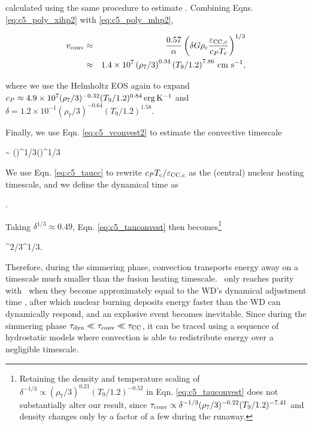 \noindent calculated using the same procedure to estimate \Lconv.  Combining Eqns. \ref{eq:c5_poly_xihp2} with \ref{eq:c5_poly_mhp2},

\begin{eqnarray}
\vconv &\approx& \frac{0.57}{\alpha}\left(\delta G\rhoc\frac{\epscentral}{c_P \Tc}\right)^{1/3} \nonumber \\
&\approx& 1.4\times10^{7}\left(\rho_7/3\right)^{0.34}\left(T_9/1.2\right)^{7.86}\,\cmpsec,
\label{eq:c5_vconvest2}
\end{eqnarray}

\noindent where we use the Helmholtz EOS again to expand $c_P \approx 4.9\times10^7(\rho_7/3)^{-0.32}(T_9/1.2)^{0.84}\,\mathrm{erg}\,\mathrm{K}^{-1}$ and $\delta = 1.2\times10^{-1}(\rho_7/3)^{-0.64}(T_9/1.2)^{1.58}$.

Finally, we use Eqn. \ref{eq:c5_vconvest2} to estimate the convective timescale

\eqbegin
\tauconv \sim {} \approx {}\left(\right)^{1/3}\left(\right)^{1/3}
\label{eq:c5_tauconvest}
\eqend

\noindent We use Eqn. \ref{eq:c5_taucc} to rewrite $c_P\Tc/\epscentral$ as the (central) nuclear heating timescale, and we define the dynamical time as

\eqbegin
\taudyn \equiv {}.
\label{eq:c5_taudyn}
\eqend


\noindent Taking $\delta^{1/3} \approx 0.49$, Eqn. \ref{eq:c5_tauconvest} then becomes\footnote{Retaining the density and temperature scaling of $\delta^{-1/3} \propto (\rho_7/3)^{0.21}(T_9/1.2)^{-0.52}$ in Eqn. \ref{eq:c5_tauconvest} does not substantially alter our result, since $\tauconv \propto \delta^{-1/3}(\rho_7/3)^{-0.22}(T_9/1.2)^{-7.41}$ and density changes only by a factor of a few during the runaway.}

\eqbegin
\tauconv {}\taudyn^{2/3}\taucc^{1/3}.
\label{eq:c5_tauconvest2}
\eqend

Therefore, during the simmering phase, convection transports energy away on a timescale much smaller than the fusion heating timescale.  \taucc\ only reaches parity with \tauconv\ when they become approximately equal to the WD's dynamical adjustment time \taudyn, after which nuclear burning deposits energy faster than the WD can dynamically respond, and an explosive event becomes inevitable.  Since during the simmering phase $\taudyn \ll \tauconv \ll \taucc$, it can be traced using a sequence of hydrostatic models where convection is able to redistribute energy over a negligible timescale.

